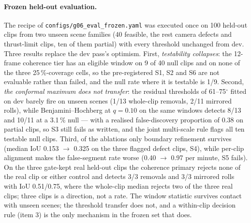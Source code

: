 % 

\paragraph{Frozen held-out evaluation.}
The recipe of \texttt{configs/g06\_eval\_frozen.yaml} was executed once on 100 held-out clips from
two unseen scene families (40 feasible, the rest camera defects and thrust-limit clips, ten of
them partial) with every threshold unchanged from dev. Three results replace the dev pass's
optimism. First, \emph{testability collapses}: the 12-frame coherence tier has an eligible window
on 9 of 40 null clips and on none of the three 25\,\%-coverage cells, so the pre-registered S1,
S2 and S6 are not evaluable rather than failed, and the null rate where it is testable is 1/9. Second,
\emph{the conformal maximum does not transfer}: the residual thresholds of 61--75$^\circ$
fitted on dev barely fire on unseen scenes (1/13 whole-clip removals, 2/11 mirrored rolls), while
Benjamini--Hochberg at $q=0.10$ on the same windows detects 8/13 and 10/11 at a 3.1\,\% null ---
with a realised false-discovery proportion of 0.38 on partial clips, so S3 still fails as written,
and the joint multi-scale rule flags all ten testable null clips. Third, of the ablations only
boundary refinement survives (median IoU 0.153 $\rightarrow$ 0.325 on the three flagged defect
clips, S4), while per-clip alignment makes the false-segment rate worse (0.40 $\rightarrow$
0.97 per minute, S5 fails). On the three gate-kept real held-out clips the coherence primary
rejects none of the real clip or either control and detects 3/3 removals and 3/3 mirrored rolls
with IoU 0.51/0.75, where the whole-clip median rejects two of the three real clips; three clips
is a direction, not a rate. The window statistic survives contact with unseen scenes; the
threshold transfer does not, and a within-clip decision rule (item 3) is the only mechanism in the
frozen set that does.
